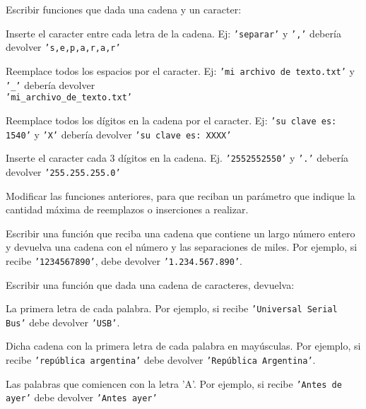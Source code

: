 \begin{ejercicio}
Escribir funciones que dada una cadena y un caracter:
\begin{partes}
\item Inserte el caracter entre cada letra de la cadena. Ej: \texttt{'separar'}
y \texttt{','} debería devolver \texttt{'s,e,p,a,r,a,r'}
\item Reemplace todos los espacios por el caracter. Ej: \texttt{'mi archivo de
texto.txt'} y \texttt{'\_'} debería devolver\\
\texttt{'mi\_archivo\_de\_texto.txt'}
\item Reemplace todos los dígitos en la cadena por el caracter. Ej: \texttt{'su
clave es: 1540'} y \texttt{'X'} debería devolver \texttt{'su clave es: XXXX'}
\item Inserte el caracter cada 3 dígitos en la cadena. Ej.
\texttt{'2552552550'} y \texttt{'.'} debería devolver \texttt{'255.255.255.0'}
\end{partes}
\end{ejercicio}


\begin{ejercicio}
Modificar las funciones anteriores, para que reciban un parámetro que indique
la cantidad máxima de reemplazos o inserciones a realizar.
\end{ejercicio}


\begin{ejercicio}
Escribir una función que reciba una cadena que contiene un largo número entero y
devuelva una cadena con el número y las separaciones de miles. Por ejemplo, si
recibe \texttt{'1234567890'}, debe devolver \texttt{'1.234.567.890'}.
\end{ejercicio}


\begin{ejercicio}
Escribir una función que dada una cadena de caracteres, devuelva:
\begin{partes}
\item La primera letra de cada palabra. Por ejemplo, si recibe
\texttt{'Universal Serial Bus'} debe devolver \texttt{'USB'}.
\item Dicha cadena con la primera letra de cada palabra en mayúsculas. Por
ejemplo, si recibe \texttt{'república argentina'} debe devolver
\texttt{'República Argentina'}.
\item Las palabras que comiencen con la letra 'A'. Por ejemplo, si recibe
\texttt{'Antes de ayer'} debe devolver \texttt{'Antes ayer'}
\end{partes}
\end{ejercicio}


